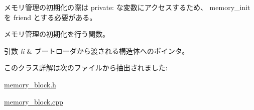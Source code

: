 メモリ管理の初期化の際は private\+: な変数にアクセスするため、 memory\+\_\+init を friend とする必要がある。

メモリ管理の初期化を行う関数。 
\begin{DoxyParams}{引数}
{\em li} & ブートローダから渡される構造体へのポインタ。 \\
\hline
\end{DoxyParams}


このクラス詳解は次のファイルから抽出されました\+:\begin{DoxyCompactItemize}
\item 
\hyperlink{memory__block_8h}{memory\+\_\+block.\+h}\item 
\hyperlink{memory__block_8cpp}{memory\+\_\+block.\+cpp}\end{DoxyCompactItemize}
